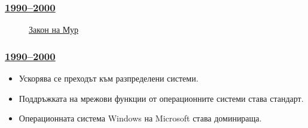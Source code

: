 \documentclass[ignorenonframetext, hyperref=unicode]{beamer}
\begin{document}
\begin{frame}
\frametitle{\href{http://en.wikipedia.org/wiki/History_of_computing_hardware_(1960s-present)}{
1990--2000}}
\begin{figure}
\center
{}
\caption{\href{http://en.wikipedia.org/wiki/Image:Moore_Law_diagram_(2004).png}{Закон на Мур}} 
\end{figure}

\end{frame}


\begin{frame}
\frametitle{\href{http://en.wikipedia.org/wiki/History_of_computing_hardware_(1960s-present)}{
1990--2000}}
\begin{itemize}
  \item Ускорява се преходът към разпределени системи.
  \item Поддръжката на мрежови функции от операционните системи става стандарт.
  \item Операционната система Windows на Microsoft става доминираща.
\end{itemize}
\end{frame}
\end{document}

